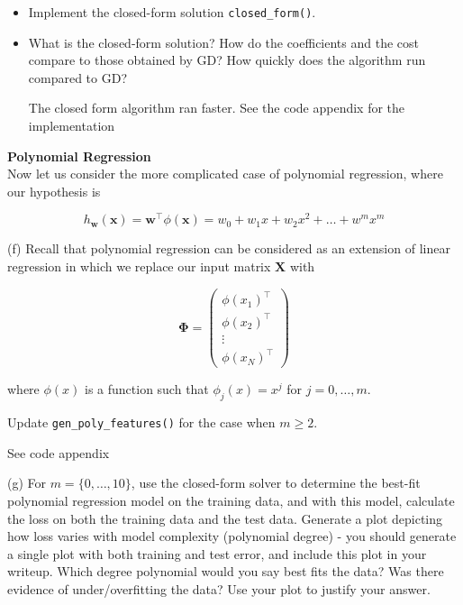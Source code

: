 \documentclass[letterpaper]{article}
\theoremstyle{definition}
\begin{document}
\begin{enumerate}
\begin{enumerate}
\begin{itemize}
\item Implement the closed-form solution \texttt{closed\_form()}.
\item What is the closed-form solution? How do the coefficients and the cost compare to those
obtained by GD? How quickly does the algorithm run compared to GD?

\color{teal}
The closed form algorithm ran faster. See the code appendix for the implementation
\color{black}
\end{itemize}
\end{enumerate}

\textbf{Polynomial Regression} \\[0pt]

Now let us consider the more complicated case of polynomial regression, where our hypothesis is

$$
   h_{\mathbf{w}}(\mathbf{x})=\mathbf{w}^{\top} \phi(\mathbf{x})=w_{0}+w_{1} x+w_{2} x^{2}+\ldots+w^{m} x^{m}
   $$

(f) Recall that polynomial regression can be considered as an extension of linear regression in which we replace our input matrix \(\boldsymbol{X}\) with

$$
   \boldsymbol{\Phi}=\left(\begin{array}{c}
   \phi\left(x_{1}\right)^{\top} \\
   \phi\left(x_{2}\right)^{\top} \\
   \vdots \\
   \phi\left(x_{N}\right)^{\top}
   \end{array}\right)
   $$

where \(\phi(x)\) is a function such that \(\phi_{j}(x)=x^{j}\) for \(j=0, \ldots, m\).

Update \texttt{gen\_poly\_features()} for the case when \(m \geq 2\).

\color{teal}
See code appendix
\color{black}

(g) For \(m=\{0, \ldots, 10\}\), use the closed-form solver to determine the best-fit polynomial regression model on the training data, and with this model, calculate the loss on both the training data and the test data. Generate a plot depicting how loss varies with model complexity (polynomial degree) - you should generate a single plot with both training and test error, and include this plot in your writeup. Which degree polynomial would you say best fits the data? Was there evidence of under/overfitting the data? Use your plot to justify your answer.


\end{enumerate}
\end{document}
